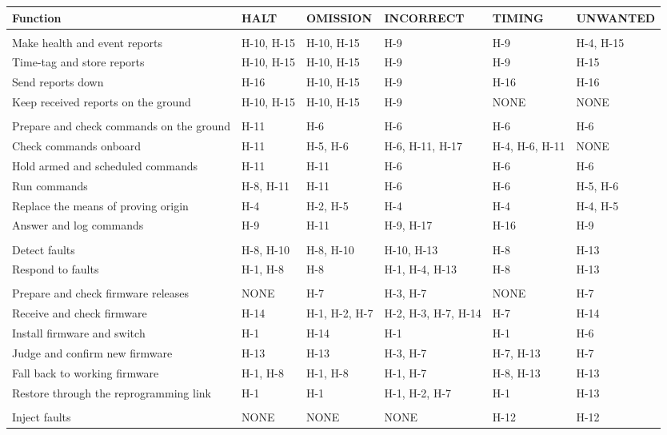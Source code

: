 \documentclass[11pt,a4paper]{article}
\begin{document}
{\footnotesize
\begin{xltabular}{\textwidth}{@{}>{\raggedright\arraybackslash}Xlllll@{}}
\toprule
Function & HALT & OMISSION & INCORRECT & TIMING & UNWANTED \\
\midrule
\endhead
{} \\
Make health and event reports & H-10, H-15 & H-10, H-15 & H-9 & H-9 & H-4, H-15 \\
Time-tag and store reports & H-10, H-15 & H-10, H-15 & H-9 & H-9 & H-15 \\
Send reports down & H-16 & H-10, H-15 & H-9 & H-16 & H-16 \\
Keep received reports on the ground & H-10, H-15 & H-10, H-15 & H-9 & NONE & NONE \\
 \\
Prepare and check commands on the ground & H-11 & H-6 & H-6 & H-6 & H-6 \\
Check commands onboard & H-11 & H-5, H-6 & H-6, H-11, H-17 & H-4, H-6, H-11 & NONE \\
Hold armed and scheduled commands & H-11 & H-11 & H-6 & H-6 & H-6 \\
Run commands & H-8, H-11 & H-11 & H-6 & H-6 & H-5, H-6 \\
Replace the means of proving origin & H-4 & H-2, H-5 & H-4 & H-4 & H-4, H-5 \\
Answer and log commands & H-9 & H-11 & H-9, H-17 & H-16 & H-9 \\
 \\
Detect faults & H-8, H-10 & H-8, H-10 & H-10, H-13 & H-8 & H-13 \\
Respond to faults & H-1, H-8 & H-8 & H-1, H-4, H-13 & H-8 & H-13 \\
 \\
Prepare and check firmware releases & NONE & H-7 & H-3, H-7 & NONE & H-7 \\
Receive and check firmware & H-14 & H-1, H-2, H-7 & H-2, H-3, H-7, H-14 & H-7 & H-14 \\
Install firmware and switch & H-1 & H-14 & H-1 & H-1 & H-6 \\
Judge and confirm new firmware & H-13 & H-13 & H-3, H-7 & H-7, H-13 & H-7 \\
Fall back to working firmware & H-1, H-8 & H-1, H-8 & H-1, H-7 & H-8, H-13 & H-13 \\
Restore through the reprogramming link & H-1 & H-1 & H-1, H-2, H-7 & H-1 & H-13 \\
 \\
Inject faults & NONE & NONE & NONE & H-12 & H-12 \\
\bottomrule
\end{xltabular}}
\end{document}
